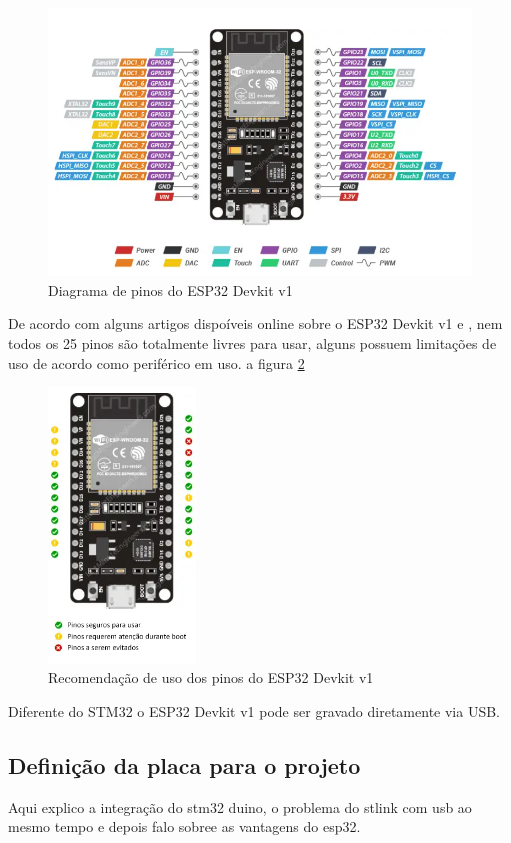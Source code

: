 \begin{figure}[ht]
	\centering
	\includegraphics[width=1.0\textwidth]{figures/esp32_pinout}
	\caption{Diagrama de pinos do ESP32 Devkit v1 \cite{esp32_reference}}
	\label{esp32_pinout}
\end{figure}

De acordo com alguns artigos dispoíveis online sobre o ESP32 Devkit v1  \cite{esp32_reference_2} e \cite{esp32_reference},
nem todos os 25 pinos são totalmente livres para usar,
alguns possuem limitações de uso de acordo como periférico em uso. a figura \ref{esp32_pinout_ref}

\begin{figure}[ht]
	\centering
	\includegraphics[width=0.35\textwidth]{figures/esp32_pinout_ref}
	\caption{Recomendação de uso dos pinos do ESP32 Devkit v1 \cite{esp32_reference}}
	\label{esp32_pinout_ref}
\end{figure}

Diferente do STM32 o ESP32 Devkit v1 pode ser gravado diretamente via USB.

\subsection{Definição da placa para o projeto}

Aqui explico a integração do stm32 duino,  o problema do stlink com usb ao mesmo tempo
e depois falo sobree as vantagens do esp32.